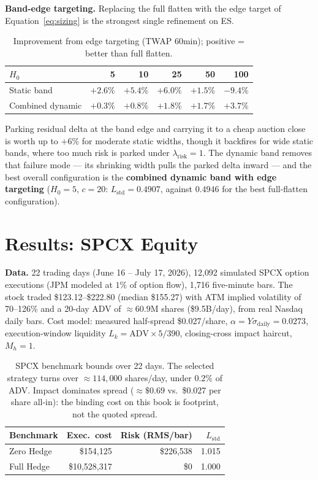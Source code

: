 \documentclass{article}
\begin{document}
\textbf{Band-edge targeting.} Replacing the full flatten with the edge target of
Equation~\eqref{eq:sizing} is the strongest single refinement on ES.

\begin{table}[htbp]
\centering
\small
\begin{tabular}{lrrrrr}
\toprule
$H_0$ & 5 & 10 & 25 & 50 & 100 \\
\midrule
Static band      & $+2.6\%$ & $+5.4\%$ & $+6.0\%$ & $+1.5\%$ & $-9.4\%$ \\
Combined dynamic & $+0.3\%$ & $+0.8\%$ & $+1.8\%$ & $+1.7\%$ & $+3.7\%$ \\
\bottomrule
\end{tabular}
\caption{Improvement from edge targeting (TWAP 60min); positive = better than full
flatten.}
\end{table}

Parking residual delta at the band edge and carrying it to a cheap auction close is worth
up to $+6\%$ for moderate static widths, though it backfires for wide static bands, where
too much risk is parked under $\lambda_{\text{risk}} = 1$. The dynamic band removes that
failure mode --- its shrinking width pulls the parked delta inward --- and the best overall
configuration is the \textbf{combined dynamic band with edge targeting}
($H_0 = 5$, $c = 20$: $L_{\text{std}} = 0.4907$, against $0.4946$ for the best
full-flatten configuration).

\section{Results: SPCX Equity}

\textbf{Data.} 22 trading days (June 16 -- July 17, 2026), 12{,}092 simulated SPCX option
executions (JPM modeled at $1\%$ of option flow), 1{,}716 five-minute bars. The stock traded
\$123.12--\$222.80 (median \$155.27) with ATM implied volatility of 70--126\% and a 20-day ADV
of $\approx60.9$M shares (\$9.5B/day), from real Nasdaq daily bars. Cost model: measured
half-spread \$0.027/share, $\alpha = Y\sigma_{\text{daily}} = 0.0273$, execution-window
liquidity $L_k = \text{ADV}\times 5/390$, closing-cross impact haircut, $M_h = 1$.

\begin{table}[htbp]
\centering
\small
\begin{tabular}{lrrr}
\toprule
\textbf{Benchmark} & \textbf{Exec.\ cost} & \textbf{Risk (RMS/bar)} & $L_{\text{std}}$ \\
\midrule
Zero Hedge & \$154{,}125     & \$226{,}538 & 1.015 \\
Full Hedge & \$10{,}528{,}317 & \$0         & 1.000 \\
\bottomrule
\end{tabular}
\caption{SPCX benchmark bounds over 22 days. The selected strategy turns over
$\approx114{,}000$ shares/day, under $0.2\%$ of ADV. Impact dominates spread
($\approx\$0.69$ vs.\ \$0.027 per share all-in): the binding cost on this book is footprint,
not the quoted spread.}
\end{table}
\end{document}
